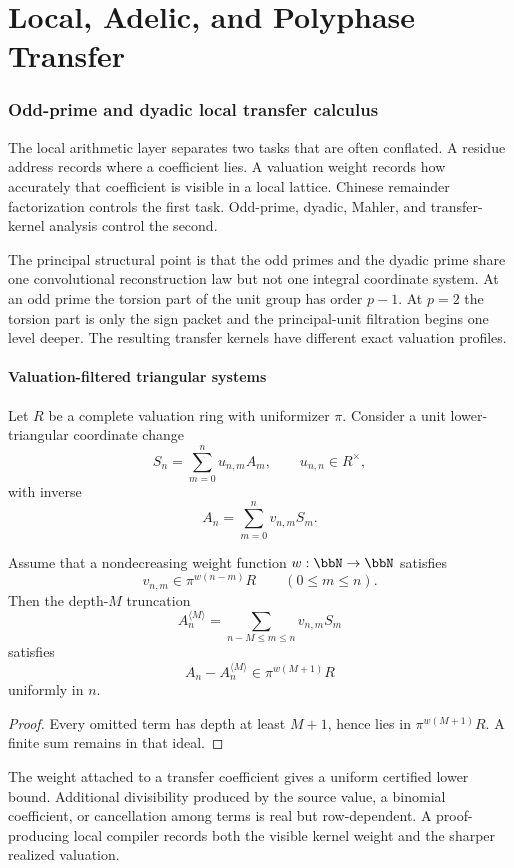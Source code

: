 \part{Local, Adelic, and Polyphase Transfer}
\section{Odd-prime and dyadic local transfer calculus}

The local arithmetic layer separates two tasks that are often conflated. A residue address records where a coefficient lies. A valuation weight records how accurately that coefficient is visible in a local lattice. Chinese remainder factorization controls the first task. Odd-prime, dyadic, Mahler, and transfer-kernel analysis control the second.

The principal structural point is that the odd primes and the dyadic prime share one convolutional reconstruction law but not one integral coordinate system. At an odd prime the torsion part of the unit group has order $p-1$. At $p=2$ the torsion part is only the sign packet and the principal-unit filtration begins one level deeper. The resulting transfer kernels have different exact valuation profiles.

\subsection{Valuation-filtered triangular systems}
Let $R$ be a complete valuation ring with uniformizer $\pi$. Consider a unit lower-triangular coordinate change
\[
 S_n=\sum_{m=0}^{n}u_{n,m}A_m,
 \qquad u_{n,n}\in R^\times,
\]
with inverse
\[
 A_n=\sum_{m=0}^{n}v_{n,m}S_m.
\]

\begin{theorem}
Assume that a nondecreasing weight function $w:\bbN\to\bbN$ satisfies
\[
 v_{n,m}\in \pi^{w(n-m)}R
 \qquad(0\leq m\leq n).
\]
Then the depth-$M$ truncation
\[
 A_n^{\langle M\rangle}
 =\sum_{n-M\leq m\leq n}v_{n,m}S_m
\]
satisfies
\[
 \boxed{A_n-A_n^{\langle M\rangle}\in \pi^{w(M+1)}R}
\]
uniformly in $n$.
\end{theorem}

\begin{proof}
Every omitted term has depth at least $M+1$, hence lies in $\pi^{w(M+1)}R$. A finite sum remains in that ideal.
\end{proof}

\begin{principle}
The weight attached to a transfer coefficient gives a uniform certified lower bound. Additional divisibility produced by the source value, a binomial coefficient, or cancellation among terms is real but row-dependent. A proof-producing local compiler records both the visible kernel weight and the sharper realized valuation.
\end{principle}

